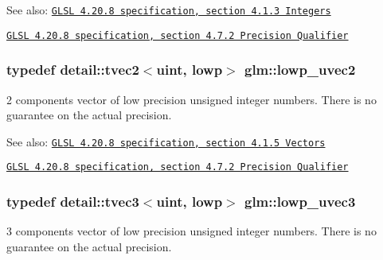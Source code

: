 \begin{Desc}
\item[See also:]\href{http://www.opengl.org/registry/doc/GLSLangSpec.4.20.8.pdf}{\tt GLSL 4.20.8 specification, section 4.1.3 Integers} 

\href{http://www.opengl.org/registry/doc/GLSLangSpec.4.20.8.pdf}{\tt GLSL 4.20.8 specification, section 4.7.2 Precision Qualifier} \end{Desc}
\hypertarget{group__core__precision_g06c64bb528bbecf276ab2d4a2b6c934e}{
\subsubsection[lowp\_\-uvec2]{\setlength{\rightskip}{0pt plus 5cm}typedef detail::tvec2$<$uint, lowp$>$ {\bf glm::lowp\_\-uvec2}}}
\label{group__core__precision_g06c64bb528bbecf276ab2d4a2b6c934e}


2 components vector of low precision unsigned integer numbers. There is no guarantee on the actual precision.

\begin{Desc}
\item[See also:]\href{http://www.opengl.org/registry/doc/GLSLangSpec.4.20.8.pdf}{\tt GLSL 4.20.8 specification, section 4.1.5 Vectors} 

\href{http://www.opengl.org/registry/doc/GLSLangSpec.4.20.8.pdf}{\tt GLSL 4.20.8 specification, section 4.7.2 Precision Qualifier} \end{Desc}
\hypertarget{group__core__precision_g26fd88e52fe7003d41b0c57c5edffd6e}{
\subsubsection[lowp\_\-uvec3]{\setlength{\rightskip}{0pt plus 5cm}typedef detail::tvec3$<$uint, lowp$>$ {\bf glm::lowp\_\-uvec3}}}
\label{group__core__precision_g26fd88e52fe7003d41b0c57c5edffd6e}


3 components vector of low precision unsigned integer numbers. There is no guarantee on the actual precision.

